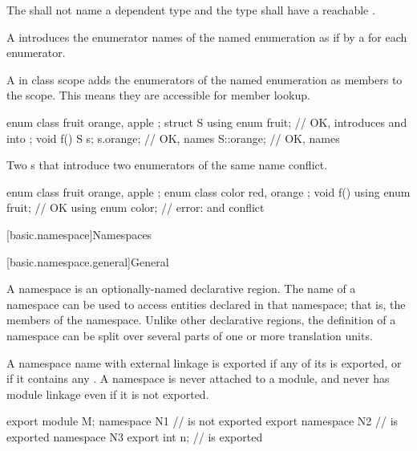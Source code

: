 \pnum
The 
shall not name a dependent type
and the type shall have a reachable .

\pnum
A 
introduces the enumerator names of the named enumeration
as if by a  for each enumerator.

\pnum
\begin{note}
A  in class scope
adds the enumerators of the named enumeration as members to the scope.
This means they are accessible for member lookup.
\begin{example}
\begin{codeblock}
enum class fruit { orange, apple };
struct S {
  using enum fruit;             // OK, introduces  and  into 
};
void f() {
  S s;
  s.orange;                     // OK, names 
  S::orange;                    // OK, names 
}
\end{codeblock}
\end{example}
\end{note}

\pnum
\begin{note}
Two s
that introduce two enumerators of the same name conflict.
\begin{example}
\begin{codeblock}
enum class fruit { orange, apple };
enum class color { red, orange };
void f() {
  using enum fruit;             // OK
  using enum color;             // error:  and  conflict
}
\end{codeblock}
\end{example}
\end{note}

[basic.namespace]{Namespaces}%

[basic.namespace.general]{General}%

\pnum
A namespace is an optionally-named declarative region. The name of a
namespace can be used to access entities declared in that namespace;
that is, the members of the namespace. Unlike other declarative regions,
the definition of a namespace can be split over several parts of one or
more translation units.

\pnum
\begin{note}
A namespace name with external linkage is exported
if any of its  is exported,
or if it contains any
.
A namespace is never attached to a module,
and never has module linkage
even if it is not exported.
\end{note}
\begin{example}
\begin{codeblock}
export module M;
namespace N1 {}                 //  is not exported
export namespace N2 {}          //  is exported
namespace N3 { export int n; }  //  is exported
\end{codeblock}
\end{example}

